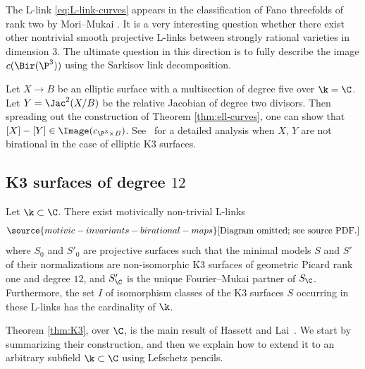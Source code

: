 \begin{remark}
\notready
The L-link \eqref{eq:L-link-curves} appears in the classification
of Fano threefolds of rank two by Mori--Mukai \cite[2) on page 117]{Mori-Mukai}.
It is a very interesting question whether
there exist other
nontrivial smooth projective
L-links between strongly rational varieties in dimension $3$. The ultimate
question in this direction
is to fully describe the image $c(\Bir(\P^3))$
using the Sarkisov link decomposition.
\end{remark}

\begin{remark}
\notready
Let $X \to B$ be an elliptic surface
with a multisection of degree five over $\k = \C$.
Let $Y = \Jac^2(X/B)$ be the relative Jacobian
of degree two divisors.
Then spreading out the construction
of Theorem \ref{thm:ell-curves},
one can show that
$[X] - [Y] \in \Image(c_{\P^3 \times B})$.
See~\cite{ShinderZhang}
for a detailed analysis when $X$, $Y$
are not birational in the case
of elliptic K3 surfaces.
\end{remark}


\subsection{K3 surfaces of degree $12$}


\begin{theorem}
\notready\label{thm:K3}
Let $\k \subset \C$.
There exist motivically
non-trivial L-links
\begin{equation}\label{eq:L-link-K3}
\source{motivic-invariants-birational-maps}
 \text{[Diagram omitted; see source PDF.]}
\end{equation}
where $S_0$ and $S'_0$ are projective
surfaces such that the minimal models $S$ and $S'$ of their normalizations
are non-isomorphic
K3 surfaces of geometric Picard
rank one and degree $12$,
and $S'_\C$ is the unique Fourier--Mukai partner of $S_\C$.
Furthermore,
the set $I$ of isomorphism classes of the K3 surfaces $S$ occurring in these L-links has the cardinality of $\k$.
\end{theorem}

Theorem \ref{thm:K3}, over $\C$,
is the main result of Hassett and Lai~\cite{HassettLai}.
We start by summarizing their construction,
and then we explain how to extend it to an arbitrary
subfield $\k \subset \C$ using Lefschetz pencils.

